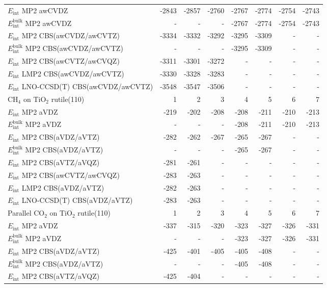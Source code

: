 \begin{longtable}{lrrrrrrr}
\midrule
$E_\text{int}$ MP2 awCVDZ & -2843 & -2857 & -2760 & -2767 & -2774 & -2754 & -2743 \\
$E_\text{int}^\text{bulk}$ MP2 awCVDZ & - & - & - & -2767 & -2774 & -2754 & -2743 \\
$E_\text{int}$ MP2 CBS(awCVDZ/awCVTZ) & -3334 & -3332 & -3292 & -3295 & -3309 & - & - \\
$E_\text{int}^\text{bulk}$ MP2 CBS(awCVDZ/awCVTZ) & - & - & - & -3295 & -3309 & - & - \\
$E_\text{int}$ MP2 CBS(awCVTZ/awCVQZ) & -3311 & -3301 & -3272 & - & - & - & - \\
$E_\text{int}$ LMP2 CBS(awCVDZ/awCVTZ) & -3330 & -3328 & -3283 & - & - & - & - \\
$E_\text{int}$ LNO-CCSD(T) CBS(awCVDZ/awCVTZ) & -3548 & -3547 & -3506 & - & - & - & - \\
\toprule
CH$_4$ on TiO$_2$ rutile(110) & 1 & 2 & 3 & 4 & 5 & 6 & 7 \\ 
\midrule
$E_\text{int}$ MP2 aVDZ & -219 & -202 & -208 & -208 & -211 & -210 & -213 \\
$E_\text{int}^\text{bulk}$ MP2 aVDZ & - & - & - & -208 & -211 & -210 & -213 \\
$E_\text{int}$ MP2 CBS(aVDZ/aVTZ) & -282 & -262 & -267 & -265 & -267 & - & - \\
$E_\text{int}^\text{bulk}$ MP2 CBS(aVDZ/aVTZ) & - & - & - & -265 & -267 & - & - \\
$E_\text{int}$ MP2 CBS(aVTZ/aVQZ) & -281 & -261 & - & - & - & - & - \\
$E_\text{int}$ MP2 CBS(awCVTZ/awCVQZ) & -283 & -263 & - & - & - & - & - \\
$E_\text{int}$ LMP2 CBS(aVDZ/aVTZ) & -282 & -263 & - & - & - & - & - \\
$E_\text{int}$ LNO-CCSD(T) CBS(aVDZ/aVTZ) & -283 & -263 & - & - & - & - & - \\
\toprule
Parallel CO$_2$ on TiO$_2$ rutile(110) & 1 & 2 & 3 & 4 & 5 & 6 & 7 \\ 
\midrule
$E_\text{int}$ MP2 aVDZ & -337 & -315 & -320 & -323 & -327 & -326 & -331 \\
$E_\text{int}^\text{bulk}$ MP2 aVDZ & - & - & - & -323 & -327 & -326 & -331 \\
$E_\text{int}$ MP2 CBS(aVDZ/aVTZ) & -425 & -401 & -405 & -405 & -408 & - & - \\
$E_\text{int}^\text{bulk}$ MP2 CBS(aVDZ/aVTZ) & - & - & - & -405 & -408 & - & - \\
$E_\text{int}$ MP2 CBS(aVTZ/aVQZ) & -425 & -404 & - & - & - & - & - \\

\end{longtable}
